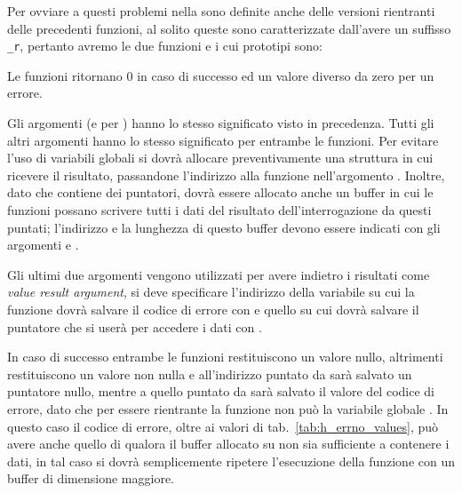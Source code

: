 Per ovviare a questi problemi nella  sono definite anche delle
versioni rientranti delle precedenti funzioni, al solito queste sono
caratterizzate dall'avere un suffisso \texttt{\_r}, pertanto avremo le due
funzioni  e  i cui prototipi
sono:

\begin{funcproto}{

}

{Le funzioni ritornano $0$ in caso di successo ed un valore diverso da zero per
  un errore.}
\end{funcproto}

Gli argomenti  (e  per ) hanno
lo stesso significato visto in precedenza. Tutti gli altri argomenti hanno lo
stesso significato per entrambe le funzioni. Per evitare l'uso di variabili
globali si dovrà allocare preventivamente una struttura  in
cui ricevere il risultato, passandone l'indirizzo alla funzione nell'argomento
.  Inoltre, dato che  contiene dei puntatori, dovrà
essere allocato anche un buffer in cui le funzioni possano scrivere tutti i
dati del risultato dell'interrogazione da questi puntati; l'indirizzo e la
lunghezza di questo buffer devono essere indicati con gli argomenti
 e .

Gli ultimi due argomenti vengono utilizzati per avere indietro i risultati
come \textit{value result argument}, si deve specificare l'indirizzo della
variabile su cui la funzione dovrà salvare il codice di errore
con  e quello su cui dovrà salvare il puntatore che si userà
per accedere i dati con .

In caso di successo entrambe le funzioni restituiscono un valore nullo,
altrimenti restituiscono un valore non nulla e all'indirizzo puntato
da  sarà salvato un puntatore nullo, mentre a quello puntato da
 sarà salvato il valore del codice di errore, dato che per
essere rientrante la funzione non può la variabile globale . In
questo caso il codice di errore, oltre ai valori di
tab.~\ref{tab:h_errno_values}, può avere anche quello di 
qualora il buffer allocato su  non sia sufficiente a contenere i
dati, in tal caso si dovrà semplicemente ripetere l'esecuzione della funzione
con un buffer di dimensione maggiore.

